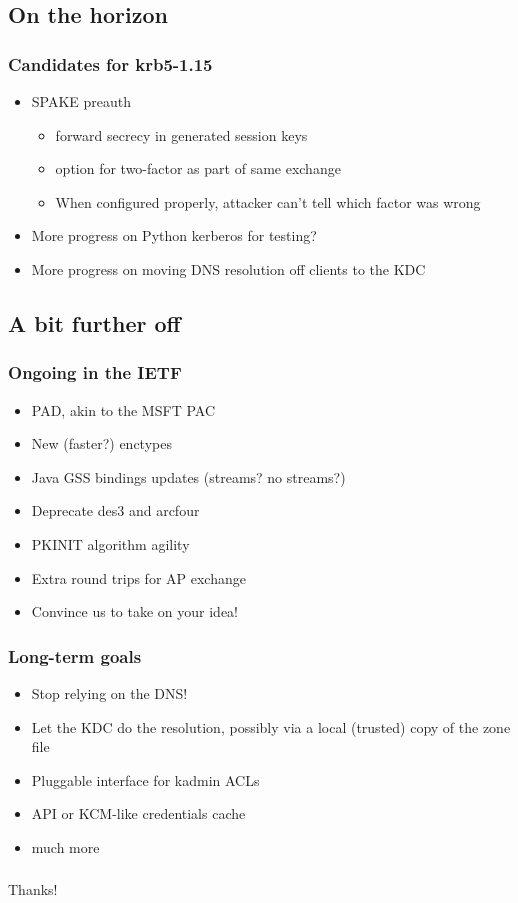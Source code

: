 \documentclass{beamer}
\begin{document}
\subsection{On the horizon}

\begin{frame}
\frametitle{Candidates for krb5-1.15}
\begin{itemize}
\item{SPAKE preauth}
	\begin{itemize}
	\item{forward secrecy in generated session keys}
	\item{option for two-factor as part of same exchange}
	\item{When configured properly, attacker can't tell which factor was
		wrong}
	\end{itemize}
\item{More progress on Python kerberos for testing?}
\item{More progress on moving DNS resolution off clients to the KDC}
\end{itemize}
\end{frame}

\subsection{A bit further off}

\begin{frame}
\frametitle{Ongoing in the IETF}
\begin{itemize}
\item{PAD, akin to the MSFT PAC}
\item{New (faster?) enctypes}
\item{Java GSS bindings updates (streams?  no streams?)}
\item{Deprecate des3 and arcfour}
\item{PKINIT algorithm agility}
\item{Extra round trips for AP exchange}
\item{Convince us to take on your idea!}
\end{itemize}
\end{frame}

\begin{frame}
\frametitle{Long-term goals}
\begin{itemize}
\item{Stop relying on the DNS!}
\item{Let the KDC do the resolution, possibly via a local (trusted) copy
	of the zone file}
\item{Pluggable interface for kadmin ACLs}
\item{API or KCM-like credentials cache}
\item{much more}
\end{itemize}
\end{frame}

\begin{frame}
\frametitle{}
\Large{Thanks!}
\end{frame}
\end{document}

